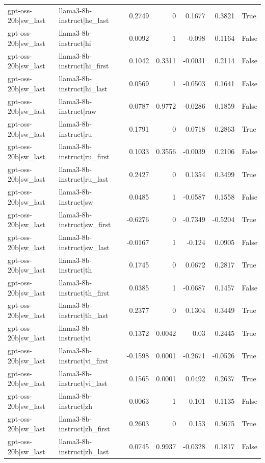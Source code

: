 \begin{table}
\begin{tabular}{l l r r r r l}
gpt-oss-20b|sw_last & llama3-8b-instruct|he_last & 0.2749 & 0 & 0.1677 & 0.3821 & True \\
gpt-oss-20b|sw_last & llama3-8b-instruct|hi & 0.0092 & 1 & -0.098 & 0.1164 & False \\
gpt-oss-20b|sw_last & llama3-8b-instruct|hi_first & 0.1042 & 0.3311 & -0.0031 & 0.2114 & False \\
gpt-oss-20b|sw_last & llama3-8b-instruct|hi_last & 0.0569 & 1 & -0.0503 & 0.1641 & False \\
gpt-oss-20b|sw_last & llama3-8b-instruct|raw & 0.0787 & 0.9772 & -0.0286 & 0.1859 & False \\
gpt-oss-20b|sw_last & llama3-8b-instruct|ru & 0.1791 & 0 & 0.0718 & 0.2863 & True \\
gpt-oss-20b|sw_last & llama3-8b-instruct|ru_first & 0.1033 & 0.3556 & -0.0039 & 0.2106 & False \\
gpt-oss-20b|sw_last & llama3-8b-instruct|ru_last & 0.2427 & 0 & 0.1354 & 0.3499 & True \\
gpt-oss-20b|sw_last & llama3-8b-instruct|sw & 0.0485 & 1 & -0.0587 & 0.1558 & False \\
gpt-oss-20b|sw_last & llama3-8b-instruct|sw_first & -0.6276 & 0 & -0.7349 & -0.5204 & True \\
gpt-oss-20b|sw_last & llama3-8b-instruct|sw_last & -0.0167 & 1 & -0.124 & 0.0905 & False \\
gpt-oss-20b|sw_last & llama3-8b-instruct|th & 0.1745 & 0 & 0.0672 & 0.2817 & True \\
gpt-oss-20b|sw_last & llama3-8b-instruct|th_first & 0.0385 & 1 & -0.0687 & 0.1457 & False \\
gpt-oss-20b|sw_last & llama3-8b-instruct|th_last & 0.2377 & 0 & 0.1304 & 0.3449 & True \\
gpt-oss-20b|sw_last & llama3-8b-instruct|vi & 0.1372 & 0.0042 & 0.03 & 0.2445 & True \\
gpt-oss-20b|sw_last & llama3-8b-instruct|vi_first & -0.1598 & 0.0001 & -0.2671 & -0.0526 & True \\
gpt-oss-20b|sw_last & llama3-8b-instruct|vi_last & 0.1565 & 0.0001 & 0.0492 & 0.2637 & True \\
gpt-oss-20b|sw_last & llama3-8b-instruct|zh & 0.0063 & 1 & -0.101 & 0.1135 & False \\
gpt-oss-20b|sw_last & llama3-8b-instruct|zh_first & 0.2603 & 0 & 0.153 & 0.3675 & True \\
gpt-oss-20b|sw_last & llama3-8b-instruct|zh_last & 0.0745 & 0.9937 & -0.0328 & 0.1817 & False \\

\end{tabular}
\end{table}
